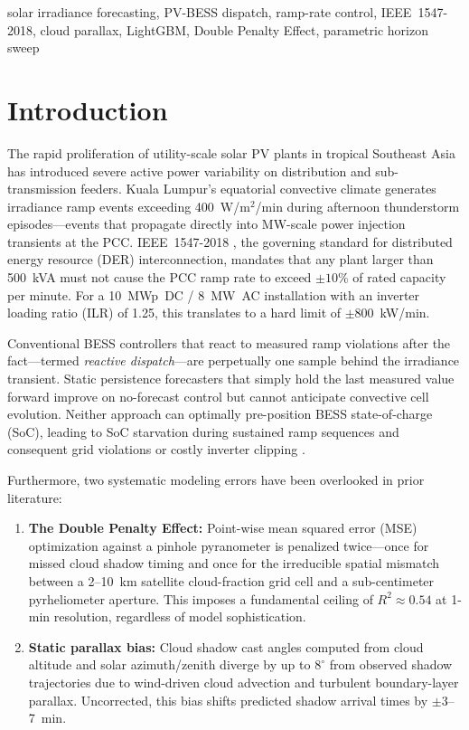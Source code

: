 \documentclass[conference]{IEEEtran}
\begin{document}
\begin{IEEEkeywords}
solar irradiance forecasting, PV-BESS dispatch, ramp-rate control,
IEEE~1547-2018, cloud parallax, LightGBM, Double Penalty Effect,
parametric horizon sweep
\end{IEEEkeywords}

\section{Introduction}

The rapid proliferation of utility-scale solar PV plants in tropical Southeast
Asia has introduced severe active power variability on distribution and
sub-transmission feeders. Kuala Lumpur's equatorial convective climate generates
irradiance ramp events exceeding 400~W/m$^2$/min during afternoon thunderstorm
episodes---events that propagate directly into MW-scale power injection
transients at the PCC. IEEE~1547-2018 \cite{b2}, the governing standard for
distributed energy resource (DER) interconnection, mandates that any plant
larger than 500~kVA must not cause the PCC ramp rate to exceed
$\pm10\%$ of rated capacity per minute. For a 10~MWp~DC / 8~MW~AC installation
with an inverter loading ratio (ILR) of 1.25, this translates to a hard limit
of $\pm800$~kW/min.

Conventional BESS controllers that react to measured ramp violations after the
fact---termed \emph{reactive dispatch}---are perpetually one sample behind the
irradiance transient. Static persistence forecasters that simply hold the last
measured value forward improve on no-forecast control but cannot anticipate
convective cell evolution. Neither approach can optimally pre-position BESS
state-of-charge (SoC), leading to SoC starvation during sustained ramp
sequences and consequent grid violations or costly inverter clipping
\cite{b7,b8}.

Furthermore, two systematic modeling errors have been overlooked in prior
literature:
\begin{enumerate}
\item \textbf{The Double Penalty Effect:} Point-wise mean squared error (MSE)
      optimization against a pinhole pyranometer is penalized twice---once for
      missed cloud shadow timing and once for the irreducible spatial mismatch
      between a 2--10~km satellite cloud-fraction grid cell and a sub-centimeter
      pyrheliometer aperture. This imposes a fundamental ceiling of
      $R^2 \approx 0.54$ at 1-min resolution, regardless of model sophistication.
\item \textbf{Static parallax bias:} Cloud shadow cast angles computed from
      cloud altitude and solar azimuth/zenith diverge by up to $8^{\circ}$ from
      observed shadow trajectories due to wind-driven cloud advection and
      turbulent boundary-layer parallax. Uncorrected, this bias shifts predicted
      shadow arrival times by $\pm3$--7~min.
\end{enumerate}
\end{document}

